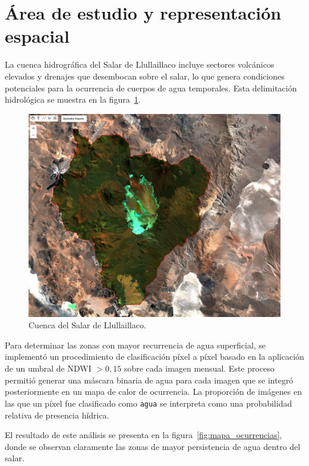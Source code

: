 \section{Área de estudio y representación espacial}

La cuenca hidrográfica del  Salar de Llullaillaco incluye sectores volcánicos elevados y drenajes que desembocan sobre el salar, lo que genera condiciones potenciales para la ocurrencia de cuerpos de agua temporales. Esta delimitación hidrológica se muestra en la figura~\ref{fig:cuenca_llullaillaco}.


\begin{figure}[htpb]
	\centering
	\includegraphics[scale=.3]{Figures/fig5.png}
	\caption{Cuenca del Salar de Llullaillaco.}
	\label{fig:cuenca_llullaillaco}
\end{figure}

Para determinar las zonas con mayor recurrencia de agua superficial, se implementó un procedimiento de clasificación píxel a píxel basado en la aplicación de un umbral de NDWI $>0{,}15$ sobre cada imagen mensual. Este proceso permitió generar una máscara binaria de agua para cada imagen que se integró posteriormente en un mapa de calor de ocurrencia. La proporción de imágenes en las que un píxel fue clasificado como \texttt{agua} se interpreta como una probabilidad relativa de presencia hídrica.

El resultado de este análisis se presenta en la figura~\ref{fig:mapa_ocurrencias}, donde se observan claramente las zonas de mayor persistencia de agua dentro del salar.


